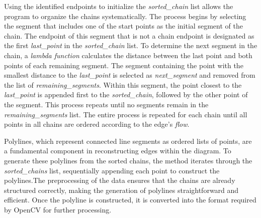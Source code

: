 Using the identified endpoints to initialize the \textit{sorted\_chain} list allows the program to organize the chains systematically. The process begins by selecting the segment that includes one of the start points as the initial segment of the chain. The endpoint of this segment that is not a chain endpoint is designated as the first \textit{last\_point} in the \textit{sorted\_chain} list. To determine the next segment in the chain, a \textit{lambda function} calculates the distance between the last point and both points of each remaining segment. The segment containing the point with the smallest distance to the \textit{last\_point} is selected as \textit{next\_segment} and removed from the list of \textit{remaining\_segments}. Within this segment, the point closest to the \textit{last\_point} is appended first to the \textit{sorted\_chain}, followed by the other point of the segment. This process repeats until no segments remain in the \textit{remaining\_segments} list. The entire process is repeated for each chain until all points in all chains are ordered according to the edge's \textit{flow}.

Polylines, which represent connected line segments as ordered lists of points, are a fundamental component in reconstructing edges within the diagram. To generate these polylines from the sorted chains, the method iterates through the \textit{sorted\_chains} list, sequentially appending each point to construct the polylines.The preprocessing of the data ensures that the chains are already structured correctly, making the generation of polylines straightforward and efficient. Once the polyline is constructed, it is converted into the format required by OpenCV for further processing.

